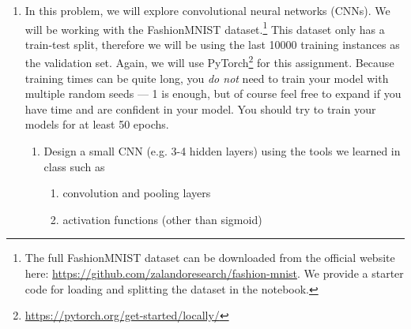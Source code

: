 \documentclass[a4paper]{article}
\begin{document}
\begin{enumerate}
\begin{enumerate}
			\item Build an MLP with a larger capacity (increase the depth and width). What do you expect to happen to your model's ability to learn the appropriate decision boundaries when you increase the depth? Increase the width? \emph{Note: Since this is a toy dataset, you might not actually observe differences in performance compared to your 1b solution. However, you should be able to reason about expected behavior based on our lecture discussions.} 
			 	\begin{enumerate}
					\item Like before, train your model using 5 random seeds and report the mean and standard deviation of the train and test accuracy at the end of 500 epochs.
					\item Report what depth and width you used. Briefly discuss what you notice about your model performance as you change these architecture decisions. \textit{Hint: Think about our discussions from the lecture regarding model capacity.}
					\item Attach the plots of training loss and testing accuracy change over epochs. 
					\item Attach the visualization of the prediction for the test set (i.e. polygon figure).
				\end{enumerate}
			\item In part (b) we had fixed the hyperparameter choices, but in part (c) you adjusted those choices for the MLP in terms of depth and width of the network. Would you consider your test results to be valid and generalizable? Please briefly discuss.
		
		\end{enumerate}
		\item In this problem, we will explore convolutional neural networks (CNNs). We will be working with the FashionMNIST dataset.\footnote{The full FashionMNIST dataset can be downloaded from the official website here: \url{https://github.com/zalandoresearch/fashion-mnist}. We provide a starter code for loading and splitting the dataset in the notebook.} This dataset only has a train-test split, therefore we will be using the last 10000 training instances as the validation set.
		Again, we will use PyTorch\footnote{\url{https://pytorch.org/get-started/locally/}} for this assignment. Because training times can be quite long, you \emph{do not} need to train your model with multiple random seeds --- 1 is enough, but of course feel free to expand if you have time and are confident in your model. You should try to train your models for at least 50 epochs.
		\begin{enumerate}
			\item 
			 Design a small CNN (e.g. 3-4 hidden layers) using the tools we learned in class such as 
			 \begin{enumerate} 
			 \item convolution and pooling layers
			 \item activation functions (other than sigmoid)
			 \end{enumerate}
			 

\end{enumerate}
\end{enumerate}
\end{document}
